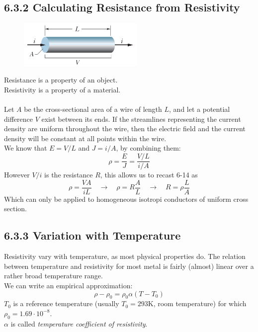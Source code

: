 \documentclass[12pt, a4paper]{article}
\begin{document}
		
		
		\newpage
		
		\subsection*{6.3.2 Calculating Resistance from Resistivity}
		
		\begin{figure}
			\centering
			\includegraphics[width=6cm]{Physics2_PNGs/elec-wire-imm.png}
			\caption*{}
			\label{fig:elec-wire-imm.png}
		\end{figure}
		Resistance is a property of an object. \\
		Resistivity is a property of a material. \\\\
		Let $A$ be the cross-sectional area of a wire of length $L$, and let a potential difference $V$ exist between its ends.
		If the streamlines representing the current density are uniform throughout the wire, then the electric field and the current density will be constant at all points within the wire. \\
		We know that $E = V/L$ and $J = i/A$, by combining them:
		\[
			\rho = \frac{E}{J} = \frac{V/L}{i/A}
			\tag{6-14}
		\]
		However $V/i$ is the resistance $R$, this allows us to recast 6-14 as
		\[
			\rho = \frac{VA}{iL} \quad \rightarrow \quad  
			\rho = R \frac{A}{L} \quad \rightarrow \quad 
			R = \rho \frac{L}{A}
			\tag{6-15}
		\]
		Which can only be applied to homogeneous isotropi conductors of uniform cross section.
		
		
		
		\subsection*{6.3.3 Variation with Temperature}
		
		Resistivity vary with temperature, as most physical properties do. The relation between temperature and resistivity for most metal is fairly (almost) linear over a rather broad temperature range. \\
		We can write an empirical approximation:
		\[
			\rho - \rho_0 = \rho_0 \alpha ( T - T_0 )
			\tag{6-16}
		\]
		$T_0$ is a reference temperature (usually $T_0 = 293$K, room temperature) for which $\rho_0 = 1.69 \cdot 10^{-8}$. \\
		$\alpha$ is called \textit{temperature coefficient of resistivity}.
		
\end{document}

